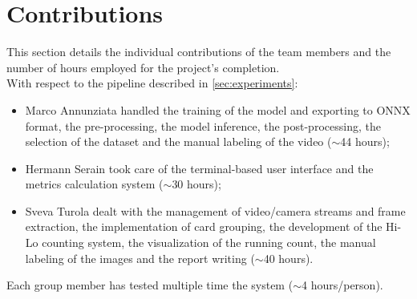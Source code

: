 \section{Contributions}
This section details the individual contributions of the team members and the number of hours employed for the project's completion.
\\ \newline
With respect to the pipeline described in \ref{sec:experiments}:
\begin{itemize}
    \item Marco Annunziata handled the training of the model and exporting to ONNX format, the pre-processing,
    the model inference, the post-processing, the selection of the dataset and the manual labeling of the video ($\sim$44 hours);
    \item Hermann Serain took care of the terminal-based user interface and the metrics calculation system ($\sim$30 hours);
    \item Sveva Turola dealt with the management of video/camera streams and frame extraction, the implementation
    of card grouping, the development of the Hi-Lo counting system, the visualization of the running count, the manual labeling
    of the images and the report writing ($\sim$40 hours).
\end{itemize}
Each group member has tested multiple time the system ($\sim$4 hours/person).